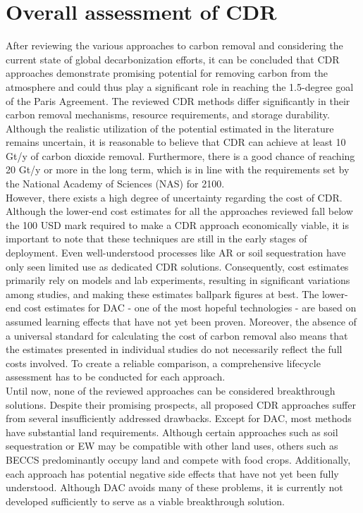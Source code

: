 \section{Overall assessment of CDR}
After reviewing the various approaches to carbon removal and considering the current state of global decarbonization efforts, it can be concluded that CDR approaches demonstrate promising potential for removing carbon from the atmosphere and could thus play a significant role in reaching the 1.5-degree goal of the Paris Agreement. The reviewed CDR methods differ significantly in their carbon removal mechanisms, resource requirements, and storage durability. Although the realistic utilization of the potential estimated in the literature remains uncertain, it is reasonable to believe that CDR can achieve at least 10 Gt/y of carbon dioxide removal. Furthermore, there is a good chance of reaching 20 Gt/y or more in the long term, which is in line with the requirements set by the National Academy of Sciences (NAS) for 2100.\\
However, there exists a high degree of uncertainty regarding the cost of CDR. Although the lower-end cost estimates for all the approaches reviewed fall below the 100 USD mark required to make a CDR approach economically viable, it is important to note that these techniques are still in the early stages of deployment. Even well-understood processes like AR or soil sequestration have only seen limited use as dedicated CDR solutions. Consequently, cost estimates primarily rely on models and lab experiments, resulting in significant variations among studies, and making these estimates ballpark figures at best. The lower-end cost estimates for DAC - one of the most hopeful technologies - are based on assumed learning effects that have not yet been proven. Moreover, the absence of a universal standard for calculating the cost of carbon removal also means that the estimates presented in individual studies do not necessarily reflect the full costs involved. To create a reliable comparison, a comprehensive lifecycle assessment has to be conducted for each approach.\\
Until now, none of the reviewed approaches can be considered breakthrough solutions. Despite their promising prospects, all proposed CDR approaches suffer from several insufficiently addressed drawbacks. Except for DAC, most methods have substantial land requirements. Although certain approaches such as soil sequestration or EW may be compatible with other land uses, others such as BECCS predominantly occupy land and compete with food crops. Additionally, each approach has potential negative side effects that have not yet been fully understood. Although DAC avoids many of these problems, it is currently not developed sufficiently to serve as a viable breakthrough solution.\\
